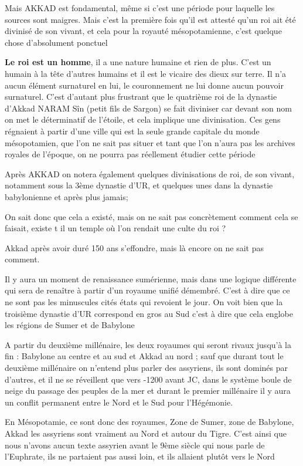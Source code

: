 \documentclass[a4paper,10pt]{article}
\begin{document}
\begin{itemize}
Mais AKKAD est fondamental, même si c'est une période
pour laquelle les sources sont maigres. Mais c'est la
première fois qu'il est attesté qu'un
roi ait été divinisé de son vivant, et cela pour la royauté
mésopotamienne, c'est quelque chose
d'absolument ponctuel

\textbf{Le roi est un homme}, il a une nature humaine et rien de plus. 
C'est un humain à la tête d'autres
humains et il est le vicaire des dieux sur terre. Il
n'a aucun élément surnaturel en lui, le couronnement
ne lui donne aucun pouvoir surnaturel. C'est
d'autant plus frustrant que le quatrième roi de la
dynastie d'Akkad NARAM Sîn (petit fils de Sargon) se
fait diviniser car devant son nom on met le déterminatif de
l'étoile, et cela implique une divinisation. Ces gens
régnaient à partir d'une ville qui est la seule grande
capitale du monde mésopotamien, que l'on ne sait pas
situer et tant que l'on n'aura pas
les archives royales de l'époque, on ne pourra pas
réellement étudier cette période

Après AKKAD on notera également quelques divinisations de roi, de son
vivant, notamment sous la 3ème dynastie d'UR, et
quelques unes dans la dynastie babylonienne et après plus jamais;

On sait donc que cela a existé, mais on ne sait pas concrètement comment
cela se faisait, existe t il un temple où l'on rendait
une culte du roi ?

Akkad après avoir duré  150 ans s'effondre, mais là
encore on ne sait pas comment.

Il y aura un moment de renaissance sumérienne, mais dans une logique
différente qui sera de renaître à partir d'un royaume
unifié démembré. C'est à dire que ce ne sont pas les
minuscules cités états qui revoient le jour. On voit bien que la
troisième dynastie d'UR correspond en gros au Sud
c'est  à dire que cela englobe les régions de Sumer et
de Babylone

A partir du deuxième millénaire, les deux royaumes qui seront rivaux
jusqu'à la fin  : Babylone au centre et au sud et
Akkad au nord ; sauf que durant tout le deuxième millénaire on
n'entend plus parler des assyriens, ils sont dominés
par d'autres, et il ne se réveillent que vers -1200
avant JC, dans le système boule de neige du passage des peuples de la
mer et durant le premier millénaire il y aura un conflit permanent
entre le Nord et le Sud pour l'Hégémonie.

En Mésopotamie, ce sont donc des royaumes, Zone de Sumer, zone de
Babylone, Akkad les  assyriens sont vraiment  au Nord et autour du
Tigre. C'est ainsi que nous n'avons
aucun texte assyrien avant le 9ème siècle qui nous parle de
l'Euphrate, ils ne partaient pas aussi loin, et ils
allaient plutôt vers le Nord


\end{itemize}
\end{document}
